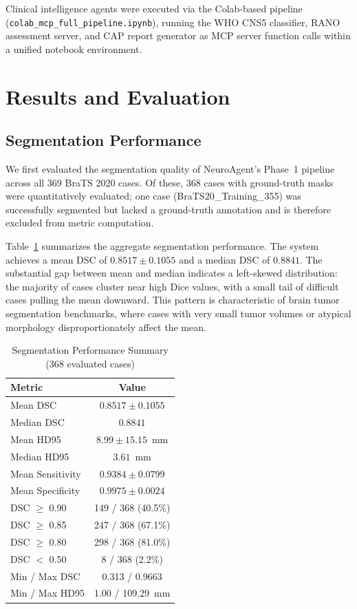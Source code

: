 Clinical intelligence agents were executed via the Colab-based pipeline (\texttt{colab\_mcp\_full\_pipeline.ipynb}), running the WHO CNS5 classifier, RANO assessment server, and CAP report generator as MCP server function calls within a unified notebook environment.


\section{Results and Evaluation}

\subsection{Segmentation Performance}
We first evaluated the segmentation quality of NeuroAgent's Phase~1 pipeline across all 369 BraTS 2020 cases. Of these, 368 cases with ground-truth masks were quantitatively evaluated; one case (BraTS20\_Training\_355) was successfully segmented but lacked a ground-truth annotation and is therefore excluded from metric computation.

Table~\ref{tab:seg_summary} summarizes the aggregate segmentation performance. The system achieves a mean DSC of $0.8517 \pm 0.1055$ and a median DSC of $0.8841$. The substantial gap between mean and median indicates a left-skewed distribution: the majority of cases cluster near high Dice values, with a small tail of difficult cases pulling the mean downward. This pattern is characteristic of brain tumor segmentation benchmarks, where cases with very small tumor volumes or atypical morphology disproportionately affect the mean.

\begin{table}[t]
\centering
\caption{Segmentation Performance Summary (368 evaluated cases)}
\label{tab:seg_summary}
\begin{tabular}{lc}
\hline
\textbf{Metric} & \textbf{Value} \\
\hline
Mean DSC & $0.8517 \pm 0.1055$ \\
Median DSC & $0.8841$ \\
Mean HD95 & $8.99 \pm 15.15$~mm \\
Median HD95 & $3.61$~mm \\
Mean Sensitivity & $0.9384 \pm 0.0799$ \\
Mean Specificity & $0.9975 \pm 0.0024$ \\
DSC $\geq$ 0.90 & 149 / 368 (40.5\%) \\
DSC $\geq$ 0.85 & 247 / 368 (67.1\%) \\
DSC $\geq$ 0.80 & 298 / 368 (81.0\%) \\
DSC $<$ 0.50 & 8 / 368 (2.2\%) \\
Min / Max DSC & 0.313 / 0.9663 \\
Min / Max HD95 & 1.00 / 109.29~mm \\
\hline
\end{tabular}
\end{table}

